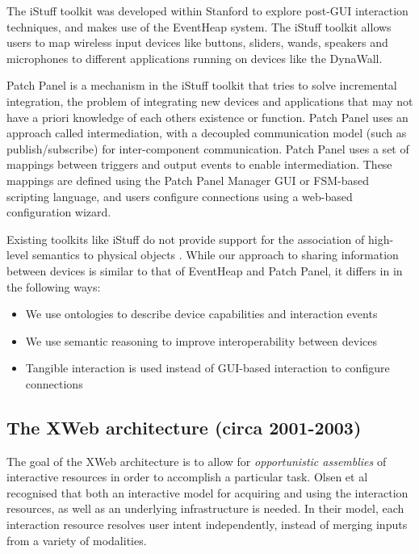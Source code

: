 The iStuff toolkit \cite{Ballagas2003} was developed within Stanford to explore post-\ac{GUI} interaction techniques, and makes use of the EventHeap system. The iStuff toolkit allows users to map wireless input devices like buttons, sliders, wands, speakers and microphones to different applications running on devices like the DynaWall.


Patch Panel \cite{Ballagas2004} is a mechanism in the iStuff toolkit that tries to solve incremental integration, the problem of integrating new devices and applications that may not have a priori knowledge of each others existence or function. Patch Panel uses an approach called intermediation, with a decoupled communication model (such as publish/subscribe) for inter-component communication.  Patch Panel uses a set of mappings between triggers and output events to enable intermediation. These mappings are defined using the Patch Panel Manager \ac{GUI} or \ac{FSM}-based scripting language, and users configure connections using a web-based configuration wizard.



Existing toolkits like iStuff do not provide support for the association of high-level semantics to physical objects \cite{Shaer2004}. While our approach to sharing information between devices is similar to that of EventHeap and Patch Panel, it differs in in the following ways:

\begin{itemize}
    \item We use ontologies to describe device capabilities and interaction events
    \item We use semantic reasoning to improve interoperability between devices
    \item Tangible interaction is used instead of \ac{GUI}-based interaction to configure connections
\end{itemize}


\subsection{The XWeb architecture (circa 2001-2003)}
The goal of the XWeb architecture is to allow for \emph{opportunistic assemblies} of interactive resources in order to accomplish a particular task. Olsen et al \cite{Olsen2001} recognised that both an interactive model for acquiring and using the interaction resources, as well as an underlying infrastructure is needed. In their model, each interaction resource resolves user intent independently, instead of merging inputs from a variety of modalities.

